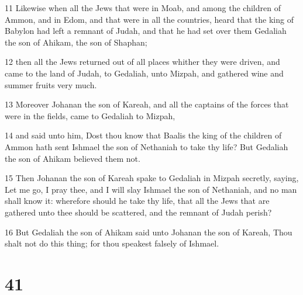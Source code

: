 \par 11 Likewise when all the Jews that were in Moab, and among the children of Ammon, and in Edom, and that were in all the countries, heard that the king of Babylon had left a remnant of Judah, and that he had set over them Gedaliah the son of Ahikam, the son of Shaphan;
\par 12 then all the Jews returned out of all places whither they were driven, and came to the land of Judah, to Gedaliah, unto Mizpah, and gathered wine and summer fruits very much.
\par 13 Moreover Johanan the son of Kareah, and all the captains of the forces that were in the fields, came to Gedaliah to Mizpah,
\par 14 and said unto him, Dost thou know that Baalis the king of the children of Ammon hath sent Ishmael the son of Nethaniah to take thy life? But Gedaliah the son of Ahikam believed them not.
\par 15 Then Johanan the son of Kareah spake to Gedaliah in Mizpah secretly, saying, Let me go, I pray thee, and I will slay Ishmael the son of Nethaniah, and no man shall know it: wherefore should he take thy life, that all the Jews that are gathered unto thee should be scattered, and the remnant of Judah perish?
\par 16 But Gedaliah the son of Ahikam said unto Johanan the son of Kareah, Thou shalt not do this thing; for thou speakest falsely of Ishmael.

\chapter{41}

